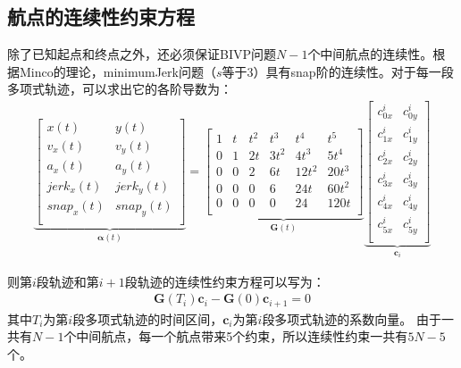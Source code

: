 \documentclass[master,academic]{ysuthesis} %
\begin{document}
		\subsection{航点的连续性约束方程} 
		除了已知起点和终点之外，还必须保证BIVP问题$N-1$个中间航点的连续性。根据Minco的理论，minimumJerk问题（$s$等于3）具有snap阶的连续性。对于每一段多项式轨迹，可以求出它的各阶导数为：
		\begin{equation}
			\begin{aligned}
				\underbrace{\begin{bmatrix}
					x(t)& y(t)\\
					v_x(t)& v_y(t)\\
					a_x(t)& a_y(t)\\
					jerk_x(t)& jerk_y(t)\\
					snap_x(t)& snap_y(t)\\
				\end{bmatrix}}_{\bm{\alpha}(t) }
					= \underbrace{\begin{bmatrix}
						1&		t&		t^2&		t^3&		t^4&		t^5\\
						0&		1&		2t&		3t^2&		4t^3&		5t^4\\
						0&		0&		2&		6t&		12t^2&		20t^3\\
						0&		0&		0&		6&		24t&		60t^2\\
						0&		0&		0&		0&		24&		120t\\
					\end{bmatrix}}_{\bm{G}(t)}
					  \underbrace{\begin{bmatrix}
						c_{0x}^{i}&		c_{0y}^{i}\\
						c_{1x}^{i}&		c_{1y}^{i}\\
						c_{2x}^{i}&		c_{2y}^{i}\\
						c_{3x}^{i}&		c_{3y}^{i}\\
						c_{4x}^{i}&		c_{4y}^{i}\\
						c_{5x}^{i}&		c_{5y}^{i}\\
					\end{bmatrix}}_{\bm{c}_i}
			\end{aligned}
		\end{equation}
		
		则第$i$段轨迹和第$i+1$段轨迹的连续性约束方程可以写为：
		\begin{equation}
			\begin{aligned}
				\bm{G}(T_i)\bm{c}_i-\bm{G}(0)\bm{c}_{i+1} = 0
			\end{aligned}
		\end{equation}
		其中$T_i$为第$i$段多项式轨迹的时间区间，$\bm{c}_i$为第$i$段多项式轨迹的系数向量。
		由于一共有$N-1$个中间航点，每一个航点带来5个约束，所以连续性约束一共有$5N-5$个。
		
\end{document}
